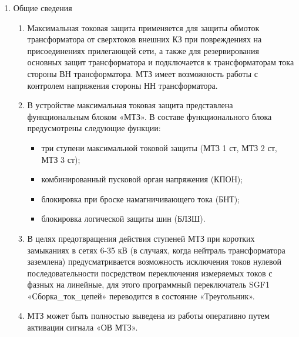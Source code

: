 
\color{black}

\begin{enumerate}

\item Общие сведения

\begin{enumerate}

\item
Максимальная токовая защита применяется для защиты обмоток трансформатора от сверхтоков внешних КЗ при повреждениях на присоединениях прилегающей сети, а также для резервирования основных защит трансформатора и подключается к трансформаторам тока стороны ВН трансформатора. МТЗ имеет возможность работы с контролем напряжения стороны НН трансформатора.

\item
В устройстве максимальная токовая защита представлена функциональным блоком «МТЗ». В составе функционального блока предусмотрены следующие функции:
\begin{itemize}
\item три ступени максимальной токовой защиты (МТЗ 1 ст, МТЗ 2 ст, МТЗ 3 ст);
\item комбинированный пусковой орган напряжения (КПОН);
\item блокировка при броске намагничивающего тока (БНТ);
\item блокировка логической защиты шин (БЛЗШ).
\end{itemize}

\item
В целях предотвращения действия ступеней МТЗ при коротких замыканиях в сетях 6-35 кВ (в случаях, когда нейтраль трансформатора заземлена) предусматривается возможность  исключения токов нулевой последовательности посредством переключения измеряемых токов с фазных на линейные, для этого программный переключатель SGF1 «Сборка\_ток\_цепей» переводится в состояние «Треугольник».

\item
МТЗ может быть полностью выведена из работы оперативно путем активации сигнала «ОВ МТЗ».

\end{enumerate}


\end{enumerate}
